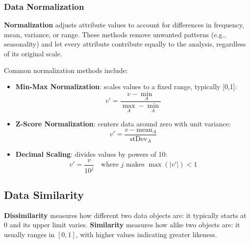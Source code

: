 \subsubsection{Data Normalization}
\textbf{Normalization} adjusts attribute values to account for differences in frequency, mean, variance, or range. These methods remove unwanted patterns (e.g., seasonality) and let every attribute contribute equally to the analysis, regardless of its original scale.

Common normalization methods include:

\begin{itemize}
    \item \textbf{Min-Max Normalization}: scales values to a fixed range, typically [0,1]:
    \begin{equation}
        v' = \frac{v - \min_A}{\max_A - \min_A}
    \end{equation}
    
    \item \textbf{Z-Score Normalization}: centers data around zero with unit variance:
    \begin{equation}
        v' = \frac{v - \text{mean}_A}{\text{stDev}_A}
    \end{equation}
    
    \item \textbf{Decimal Scaling}: divides values by powers of 10:
    \begin{equation}
        v' = \frac{v}{10^j} \quad \text{where $j$ makes $\max(|v'|) < 1$}
    \end{equation}
\end{itemize}

\subsection{Data Similarity}
\textbf{Dissimilarity} measures how different two data objects are: it typically starts at 0 and its upper limit varies. \textbf{Similarity} measures how alike two objects are: it usually ranges in $[0,1]$, with higher values indicating greater likeness.

